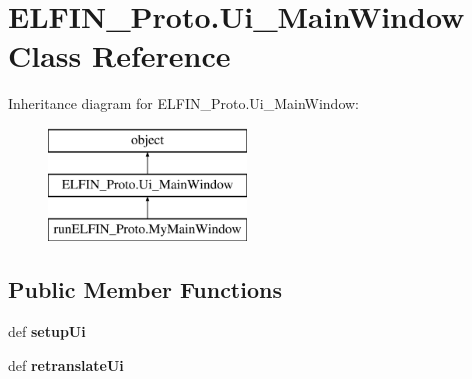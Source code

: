 \hypertarget{classELFIN__Proto_1_1Ui__MainWindow}{\section{E\-L\-F\-I\-N\-\_\-\-Proto.\-Ui\-\_\-\-Main\-Window Class Reference}
\label{classELFIN__Proto_1_1Ui__MainWindow}
}
Inheritance diagram for E\-L\-F\-I\-N\-\_\-\-Proto.\-Ui\-\_\-\-Main\-Window\-:\begin{figure}[H]
\begin{center}
\leavevmode
\includegraphics[height=3.000000cm]{classELFIN__Proto_1_1Ui__MainWindow}
\end{center}
\end{figure}
\subsection*{Public Member Functions}
\begin{DoxyCompactItemize}
\item 
\hypertarget{classELFIN__Proto_1_1Ui__MainWindow_a79285f206f571c8615ca10984de1ec34}{def {\bfseries setup\-Ui}}\label{classELFIN__Proto_1_1Ui__MainWindow_a79285f206f571c8615ca10984de1ec34}

\item 
\hypertarget{classELFIN__Proto_1_1Ui__MainWindow_a440ebc99241b0411d44d305985e27048}{def {\bfseries retranslate\-Ui}}\label{classELFIN__Proto_1_1Ui__MainWindow_a440ebc99241b0411d44d305985e27048}

\end{DoxyCompactItemize}
